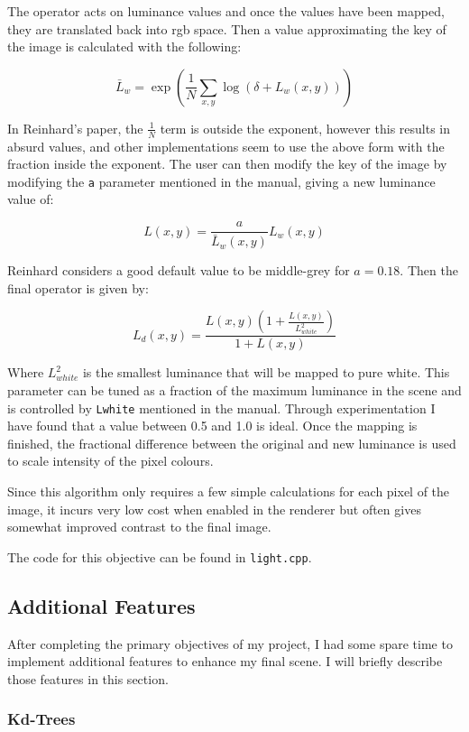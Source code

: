 \documentclass[12pt]{article}
\begin{document}
The operator acts on luminance values and once the values have been mapped, they are translated back into rgb space.
Then a value approximating the key of the image is calculated with the following:

$$\bar{L}_w=\exp\left( \frac{1}{N}\sum_{x,y}\log(\delta + L_w(x,y))\right)$$

In Reinhard's paper, the $\frac{1}{N}$ term is outside the exponent, however this results in absurd values, and other implementations seem to use the above form with the fraction inside the exponent. The user can then modify the key of the image by modifying the \texttt{a} parameter mentioned in the manual, giving a new luminance value of:

$$L(x,y) = \frac{a}{\bar{L}_w(x,y)}L_w(x,y)$$

Reinhard considers a good default value to be middle-grey for $a=0.18$. Then the final operator is given by:

$$L_d(x,y)=\frac{L(x,y)\left(1+\frac{L(x,y)}{L^2_{white}}\right) }{1 + L(x,y)}$$

Where $L^2_{white}$ is the smallest luminance that will be mapped to pure white. This parameter can be tuned as a fraction of the maximum luminance in the scene and is controlled by \texttt{Lwhite} mentioned in the manual. Through experimentation I have found that a value between 0.5 and 1.0 is ideal. Once the mapping is finished, the fractional difference between the original and new luminance is used to scale intensity of the pixel colours.

Since this algorithm only requires a few simple calculations for each pixel of the image, it incurs very low cost when enabled in the renderer but often gives somewhat improved contrast to the final image.

The code for this objective can be found in \texttt{light.cpp}.

\subsection{Additional Features}

After completing the primary objectives of my project, I had some spare time to implement additional features to enhance my final scene. I will briefly describe those features in this section.

\subsubsection{Kd-Trees}
\end{document}
